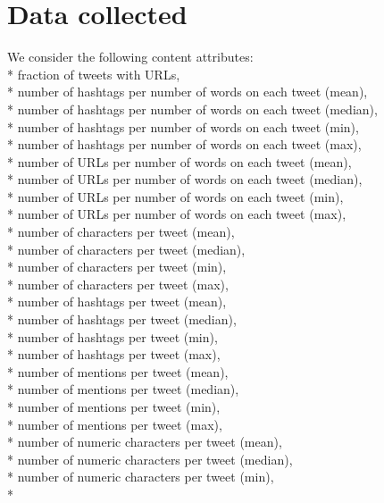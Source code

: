 \documentclass[11pt]{article}
\begin{document}
\newpage
\appendix
\renewcommand\thesection{\appendixname~\Alph{section}}
\renewcommand\theequation{\Alph{section}.\arabic{equation}}
\section{Data collected}
	We consider the following content attributes: \\*
	\newline
fraction of tweets with URLs, \\*
number of hashtags per number of words on each tweet (mean), \\*
number of hashtags per number of words on each tweet (median), \\*
number of hashtags per number of words on each tweet (min), \\*
number of hashtags per number of words on each tweet (max), \\*
number of URLs per number of words on each tweet (mean), \\*
number of URLs per number of words on each tweet (median), \\*
number of URLs per number of words on each tweet (min), \\*
number of URLs per number of words on each tweet (max), \\*
number of characters per tweet (mean), \\*
number of characters per tweet (median), \\*
number of characters per tweet (min), \\*
number of characters per tweet (max), \\*
number of hashtags per tweet (mean), \\*
number of hashtags per tweet (median), \\*
number of hashtags per tweet (min), \\*
number of hashtags per tweet (max), \\*
number of mentions per tweet (mean), \\*
number of mentions per tweet (median),\\*
number of mentions per tweet (min),\\*
number of mentions per tweet (max),\\*
number of numeric characters per tweet (mean),\\*
number of numeric characters per tweet (median),\\*
number of numeric characters per tweet (min),\\*
\end{document}
